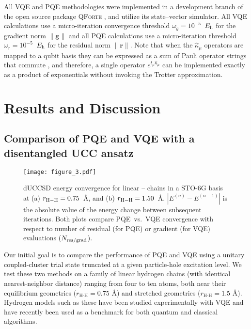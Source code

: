 \documentclass[aps,prx, reprint]{revtex4-2}
\newcommand*{\Eh}{$E_{\rm h}$\xspace}
\providecommand{\normnorm}[1]{\lVert#1\rVert}
\begin{document}
All VQE and PQE methodologies were implemented in a development branch of the open source package \textsc{QForte}
, and utilize its state--vector simulator.
All VQE calculations use a micro-iteration convergence threshold $\omega_g = 10^{-5}$~\Eh for the gradient norm $\normnorm{\mathbf{g}}$ and all PQE calculations use a micro-iteration threshold $\omega_r = 10^{-5}$~\Eh for the residual norm $\normnorm{ \mathbf{r} }$.
Note that when the $\hat{\kappa}_\mu$ operators are mapped to a qubit basis they can be expressed as a sum of Pauli operator strings that commute \cite{Romero:2019hk}, and therefore, a single operator $e^{t_\mu \hat{\kappa}_\mu}$ can be implemented exactly as a product of exponentials without invoking the Trotter approximation.

\section{Results and Discussion}
\label{sec:results}

\subsection{Comparison of PQE and VQE with a  disentangled UCC ansatz}

\begin{figure*}[ht!]
\centering
\texttt{[image: figure\_3.pdf]}
\caption{dUCCSD  energy convergence for linear -- chains in a STO-6G basis at (a) $r_{\rm{H-H}} = 0.75$~{\AA}, and (b) $r_{\rm{H-H}} = 1.50$~{\AA}. $| E^{(n)} - E^{(n-1)}|$  is the absolute value of the energy change between subsequent iterations. Both plots compare PQE~vs.~VQE convergence with respect to number of residual (for PQE) or gradient (for VQE) evaluations ($N_{\rm{res/grad}}$).}
\label{fig:Hn_econv_both}
\end{figure*}

Our initial goal is to compare the performance of PQE and VQE using a unitary coupled-cluster trial state truncated at a given particle-hole excitation level.
We test these two methods on a family of linear hydrogen chains (with identical nearest-neighbor distance) ranging from four to ten atoms, both near their equilibrium geometries ($r_\text{H-H}  = 0.75$ \AA{}) and stretched geometries ($r_\text{H-H}  = 1.5$ \AA{}).
Hydrogen models such as these have been studied experimentally with VQE \cite{google2020hartree} and have recently been used as a benchmark for both quantum \cite{grimsley2019adaptive, Stair_2020} and classical \cite{Motta2017TowardsThe, motta2020ground, stair2020exploring} algorithms.
\end{document}
